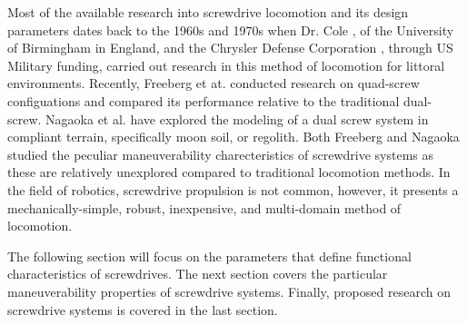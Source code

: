Most of the available research into screwdrive locomotion and its design parameters dates back to the 1960s and 1970s when Dr. Cole \cite{Cole1961}, of the University of Birmingham in England, and the Chrysler Defense Corporation \cite{Fales1972, Dugoff1967}, through US Military funding, carried out research in this method of locomotion for littoral environments. Recently, Freeberg et at. \cite{Freeberg2010} conducted research on quad-screw configuations and compared its performance relative to the traditional dual-screw. Nagaoka et al. \cite{Nagaoka2011} have explored the modeling of a dual screw system in compliant terrain, specifically moon soil, or regolith. Both Freeberg and Nagaoka studied the peculiar maneuverability charecteristics of screwdrive systems as these are relatively unexplored compared to traditional locomotion methods. In the field of robotics, screwdrive propulsion is not common, however, it presents a mechanically-simple, robust, inexpensive, and multi-domain method of locomotion. 

The following section will focus on the parameters that define functional characteristics of screwdrives. The next section covers the particular maneuverability properties of screwdrive systems. Finally, proposed research on screwdrive systems is covered in the last section. 




